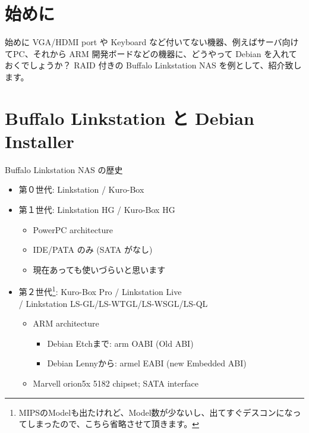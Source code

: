 \section{始めに}

\begin{frame}{始めに}
VGA/HDMI port や Keyboard など付いてない機器、例えばサーバ向けてPC、それから ARM 開発ボードなどの機器に、どうやって Debian を入れておくでしょうか？
RAID 付きの Buffalo Linkstation NAS を例として、紹介致します。
\end{frame}

\section{Buffalo Linkstation と Debian Installer}

\begin{frame}{Buffalo Linkstation NAS の歴史}
\begin{itemize}
\item 第０世代: Linkstation / Kuro-Box
\item 第１世代: Linkstation HG / Kuro-Box HG
	\begin{itemize}
	\item PowerPC architecture
	\item IDE/PATA のみ (SATA がなし)
	\item 現在あっても使いづらいと思います
	\end{itemize}
\item 第２世代\footnote{MIPSのModelも出たけれど、Model数が少ないし、出てすぐデスコンになってしまったので、こちら省略させて頂きます。}: 
Kuro-Box Pro / Linkstation Live\\/ Linkstation LS-GL/LS-WTGL/LS-WSGL/LS-QL
	\begin{itemize}
	\item ARM architecture
		\begin{itemize}
		\item Debian Etchまで: arm OABI (Old ABI)
		\item Debian Lennyから: armel EABI (new Embedded ABI)
		\end{itemize}
	\item Marvell orion5x 5182 chipset; SATA interface
	\end{itemize}
\end{itemize}
\end{frame}

